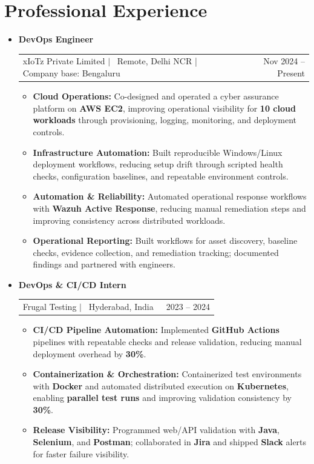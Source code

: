 \documentclass[a4paper,11pt]{article}
\makeatletter
\newcommand{\resumeJobCompact}[4]{%
\item[]
  {\small\textbf{\color{primarycolor}#1}}\\[-1pt]
  \begin{tabular*}{\textwidth}[t]{@{}>{\raggedright\arraybackslash}p{\dimexpr\textwidth - 1.75in\relax}@{\extracolsep{\fill}}r@{}}
    \small #2 $|$ \faMapMarker*\ #4 & \small\color{textgray}\faCalendar*\ #3 \\
  \end{tabular*}\par\vspace{1pt}
}
\newcommand{\resumeExpItem}[1]{
\item {\small #1}}
\newcommand{\resumeExpListStart}{
  \begin{itemize}[
        align=parleft,
        leftmargin=0.12in,
        labelindent=0pt,
        itemindent=0pt,
        label={\small\textbullet},
        labelwidth=0.45em,
        labelsep=0.22em,
        itemsep=2pt,
        topsep=0pt,
        parsep=0pt,
        partopsep=0pt
    ]}
\newcommand{\resumeExpListEnd}{
  \end{itemize}\vspace{-2pt}}
\newcommand{\resumeSubHeadingListStart}{
\begin{itemize}[leftmargin=0pt, itemindent=0pt, label={}, labelwidth=0pt, labelsep=0pt]}
\newcommand{\resumeSubHeadingListEnd}{
  \end{itemize}}
\makeatother
\begin{document}
  \section{Professional Experience}
  \resumeSubHeadingListStart

  \resumeJobCompact
  {DevOps Engineer}{xIoTz Private Limited}{Nov 2024 -- Present}{Remote, Delhi NCR | Company base: Bengaluru}
  \resumeExpListStart
  \resumeExpItem{\textbf{Cloud Operations:} Co-designed and operated a cyber assurance platform on \textbf{AWS EC2}, improving operational visibility for \textbf{10 cloud workloads} through provisioning, logging, monitoring, and deployment controls.}
  \resumeExpItem{\textbf{Infrastructure Automation:} Built reproducible Windows/Linux deployment workflows, reducing setup drift through scripted health checks, configuration baselines, and repeatable environment controls.}
  \resumeExpItem{\textbf{Automation \& Reliability:} Automated operational response workflows with \textbf{Wazuh Active Response}, reducing manual remediation steps and improving consistency across distributed workloads.}
  \resumeExpItem{\textbf{Operational Reporting:} Built workflows for asset discovery, baseline checks, evidence collection, and remediation tracking; documented findings and partnered with engineers.}
  \resumeExpListEnd

  \resumeJobCompact
  {DevOps \& CI/CD Intern}{Frugal Testing}{2023 -- 2024}{Hyderabad, India}
  \resumeExpListStart
  \resumeExpItem{\textbf{CI/CD Pipeline Automation:} Implemented \textbf{GitHub Actions} pipelines with repeatable checks and release validation, reducing manual deployment overhead by \textbf{30\%}.}
  \resumeExpItem{\textbf{Containerization \& Orchestration:} Containerized test environments with \textbf{Docker} and automated distributed execution on \textbf{Kubernetes}, enabling \textbf{parallel test runs} and improving validation consistency by \textbf{30\%}.}
  \resumeExpItem{\textbf{Release Visibility:} Programmed web/API validation with \textbf{Java}, \textbf{Selenium}, and \textbf{Postman}; collaborated in \textbf{Jira} and shipped \textbf{Slack} alerts for faster failure visibility.}
  \resumeExpListEnd

  \resumeSubHeadingListEnd

\end{document}
